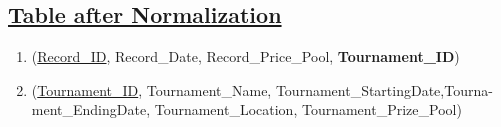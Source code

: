 \subsection*{\underline{Table after Normalization}}
\begin{enumerate}
    \item (\underline{Record\_ID}, Record\_Date, Record\_Price\_Pool, \textbf{Tournament\_ID})
    \item (\underline{Tournament\_ID}, Tournament\_Name, Tournament\_StartingDate,Tourna-\\ment\_EndingDate, Tournament\_Location, Tournament\_Prize\_Pool)
\end{enumerate}

\clearpage
